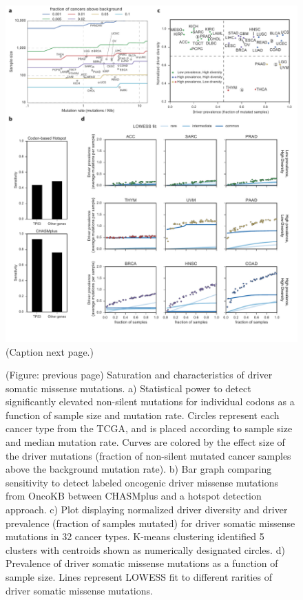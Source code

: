 \begin{figure}[b!]
  \centering
  \makeatletter
  \let\@currsize\normalsize
  \includegraphics[width=\linewidth]{figures/chapter6/diversity_and_saturation.pdf}
  \caption[Saturation and characteristics of driver somatic missense mutations.]{(Caption next page.)}
  \label{fig:chasmplus_power}
\end{figure}
\addtocounter{figure}{-1}
\begin{figure} [t!]
  \caption[(continued) Saturation and characteristics of driver somatic missense mutations.]{(Figure: previous page) Saturation and characteristics of driver somatic missense mutations. a) Statistical power to detect significantly elevated non-silent mutations for individual codons as a function of sample size and mutation rate. Circles represent each cancer type from the TCGA, and is placed according to sample size and median mutation rate. Curves are colored by the effect size of the driver mutations (fraction of non-silent mutated cancer samples above the background mutation rate). b) Bar graph comparing sensitivity to detect labeled oncogenic driver missense mutations from OncoKB between CHASMplus and a hotspot detection approach. c) Plot displaying normalized driver diversity and driver prevalence (fraction of samples mutated) for driver somatic missense mutations in 32 cancer types. K-means clustering identified 5 clusters with centroids shown as numerically designated circles. d) Prevalence of driver somatic missense mutations as a function of sample size. Lines represent LOWESS fit to different rarities of driver somatic missense mutations.}
\end{figure}


